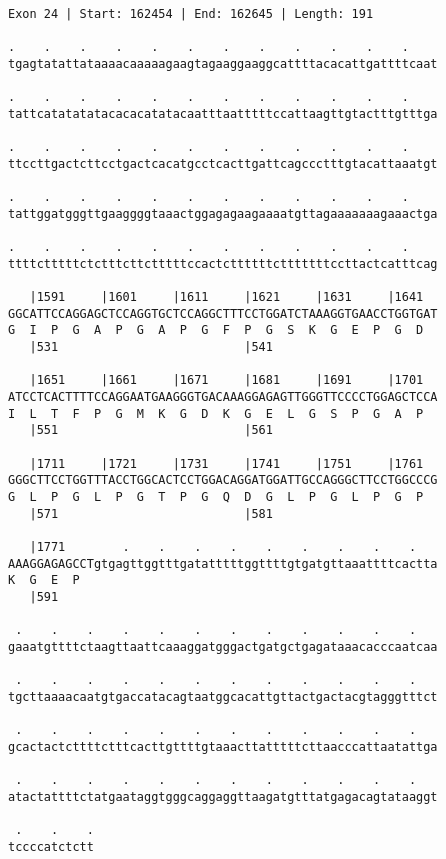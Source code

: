 \documentclass{article}
\begin{document}
\begin{Verbatim}
Exon 24 | Start: 162454 | End: 162645 | Length: 191
 
.    .    .    .    .    .    .    .    .    .    .    .    
tgagtatattataaaacaaaaagaagtagaaggaaggcattttacacattgattttcaat
  
.    .    .    .    .    .    .    .    .    .    .    .    
tattcatatatatacacacatatacaatttaatttttccattaagttgtactttgtttga
  
.    .    .    .    .    .    .    .    .    .    .    .    
ttccttgactcttcctgactcacatgcctcacttgattcagccctttgtacattaaatgt
  
.    .    .    .    .    .    .    .    .    .    .    .    
tattggatgggttgaaggggtaaactggagagaagaaaatgttagaaaaaaagaaactga
  
.    .    .    .    .    .    .    .    .    .    .    .    
ttttctttttctctttcttctttttccactcttttttctttttttccttactcatttcag
  
   |1591     |1601     |1611     |1621     |1631     |1641  
GGCATTCCAGGAGCTCCAGGTGCTCCAGGCTTTCCTGGATCTAAAGGTGAACCTGGTGAT
G  I  P  G  A  P  G  A  P  G  F  P  G  S  K  G  E  P  G  D  
   |531                          |541                       
  
   |1651     |1661     |1671     |1681     |1691     |1701  
ATCCTCACTTTTCCAGGAATGAAGGGTGACAAAGGAGAGTTGGGTTCCCCTGGAGCTCCA
I  L  T  F  P  G  M  K  G  D  K  G  E  L  G  S  P  G  A  P  
   |551                          |561                       
  
   |1711     |1721     |1731     |1741     |1751     |1761  
GGGCTTCCTGGTTTACCTGGCACTCCTGGACAGGATGGATTGCCAGGGCTTCCTGGCCCG
G  L  P  G  L  P  G  T  P  G  Q  D  G  L  P  G  L  P  G  P  
   |571                          |581                       
  
   |1771        .    .    .    .    .    .    .    .    .   
AAAGGAGAGCCTgtgagttggtttgatatttttggttttgtgatgttaaattttcactta
K  G  E  P                                                  
   |591                                                     
  
 .    .    .    .    .    .    .    .    .    .    .    .   
gaaatgttttctaagttaattcaaaggatgggactgatgctgagataaacacccaatcaa
  
 .    .    .    .    .    .    .    .    .    .    .    .   
tgcttaaaacaatgtgaccatacagtaatggcacattgttactgactacgtagggtttct
  
 .    .    .    .    .    .    .    .    .    .    .    .   
gcactactcttttctttcacttgttttgtaaacttatttttcttaacccattaatattga
  
 .    .    .    .    .    .    .    .    .    .    .    .   
atactattttctatgaataggtgggcaggaggttaagatgtttatgagacagtataaggt
  
 .    .    .
tccccatctctt
\end{Verbatim}
\end{document}
